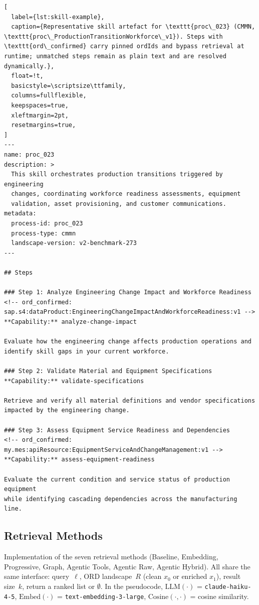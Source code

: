 \begin{lstlisting}[
  label={lst:skill-example},
  caption={Representative skill artefact for \texttt{proc\_023} (CMMN, \texttt{proc\_ProductionTransitionWorkforce\_v1}). Steps with \texttt{ord\_confirmed} carry pinned ordIds and bypass retrieval at runtime; unmatched steps remain as plain text and are resolved dynamically.},
  float=!t,
  basicstyle=\scriptsize\ttfamily,
  columns=fullflexible,
  keepspaces=true,
  xleftmargin=2pt,
  resetmargins=true,
]
---
name: proc_023
description: >
  This skill orchestrates production transitions triggered by engineering
  changes, coordinating workforce readiness assessments, equipment
  validation, asset provisioning, and customer communications.
metadata:
  process-id: proc_023
  process-type: cmmn
  landscape-version: v2-benchmark-273
---

## Steps

### Step 1: Analyze Engineering Change Impact and Workforce Readiness
<!-- ord_confirmed: sap.s4:dataProduct:EngineeringChangeImpactAndWorkforceReadiness:v1 -->
**Capability:** analyze-change-impact

Evaluate how the engineering change affects production operations and
identify skill gaps in your current workforce.

### Step 2: Validate Material and Equipment Specifications
**Capability:** validate-specifications

Retrieve and verify all material definitions and vendor specifications
impacted by the engineering change.

### Step 3: Assess Equipment Service Readiness and Dependencies
<!-- ord_confirmed: my.mes:apiResource:EquipmentServiceAndChangeManagement:v1 -->
**Capability:** assess-equipment-readiness

Evaluate the current condition and service status of production equipment
while identifying cascading dependencies across the manufacturing line.
\end{lstlisting}


\subsection{Retrieval Methods}
\label{appendix:retrieval-code}

Implementation of the seven retrieval methods (Baseline, Embedding, Progressive, Graph, Agentic Tools, Agentic Raw, Agentic Hybrid). All share the same interface: query~$\ell$, ORD landscape~$R$ (clean $x_0$ or enriched $x_1$), result size~$k$, return a ranked list or $\emptyset$. In the pseudocode, $\mathrm{LLM}(\cdot)$ = \texttt{claude-haiku-4-5}, $\mathrm{Embed}(\cdot)$ = \texttt{text-embedding-3-large}, $\mathrm{Cosine}(\cdot,\cdot)$ = cosine similarity.

